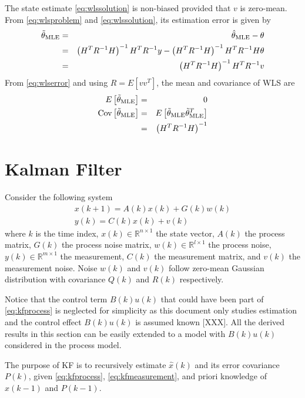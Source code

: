 The state estimate \eqref{eq:wlssolution} is non-biased provided that $v$ is zero-mean. From \eqref{eq:wlsproblem} and \eqref{eq:wlssolution}, its estimation error is given by
\begin{eqnarray}
	\tilde{\theta}_{\textup{MLE}} &=& \hat{\theta}_{\textup{MLE}} - \theta \nonumber \\
	&=& \left(H^TR^{-1}H\right)^{-1}H^TR^{-1}y - \left(H^TR^{-1}H\right)^{-1}H^TR^{-1}H\theta \nonumber \\
	&=& \left(H^TR^{-1}H\right)^{-1}H^TR^{-1}v \label{eq:wlserror}
\end{eqnarray}
From \eqref{eq:wlserror} and using $R=E[vv^T]$, the mean and covariance of WLS are
\begin{eqnarray}
	E\left[\tilde{\theta}_{\textup{MLE}}\right] &=& 0 \nonumber \\
	\textup{Cov}\left[\tilde{\theta}_{\textup{MLE}}\right] &=& E\left[\tilde{\theta}_{\textup{MLE}}\tilde{\theta}_{\textup{MLE}}^T\right] \nonumber \\
	&=& \left(H^TR^{-1}H\right)^{-1} \label{eq:wlscov}
\end{eqnarray}

\section{Kalman Filter}


Consider the following system
\begin{eqnarray}
	x(k+1) = A(k)x(k) + G(k)w(k) \label{eq:kfprocess} \\
	y(k) = C(k)x(k) + v(k) \label{eq:kfmeasurement}
\end{eqnarray}
where $k$ is the time index, $x(k)\in\mathbb{R}^{n\times 1}$ the state vector, $A(k)$ the process matrix, $G(k)$ the process noise matrix, $w(k)\in\mathbb{R}^{l\times 1}$ the process noise, $y(k)\in\mathbb{R}^{m\times 1}$ the measurement, $C(k)$ the measurement matrix, and $v(k)$ the measurement noise. Noise $w(k)$ and $v(k)$ follow zero-mean Gaussian distribution with covariance $Q(k)$ and $R(k)$ respectively.

Notice that the control term $B(k)u(k)$ that could have been part of \eqref{eq:kfprocess} is neglected for simplicity as this document only studies estimation and the control effect $B(k)u(k)$ is assumed known [XXX]. All the derived results in this section can be easily extended to a model with $B(k)u(k)$ considered in the process model.

The purpose of KF is to recursively estimate $\hat{x}(k)$ and its error covariance $P(k)$, given \eqref{eq:kfprocess}, \eqref{eq:kfmeasurement}, and priori knowledge of $\hat{x}(k-1)$ and $P(k-1)$.

